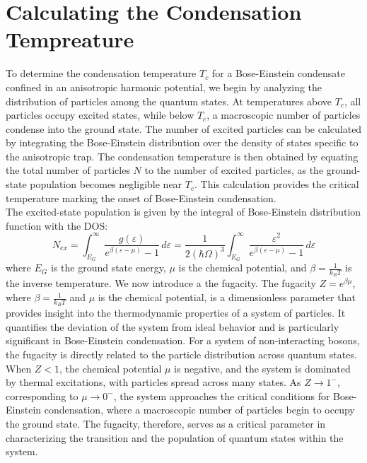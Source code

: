 \documentclass{article}
\numberwithin{equation}{section}
\numberwithin{equation}{subsection}
\begin{document}
\section{Calculating the Condensation Tempreature}
To determine the condensation temperature \( T_c \) for a Bose-Einstein condensate confined in an anisotropic harmonic potential, we begin by analyzing the distribution of particles among the quantum states. At temperatures above \( T_c \), all particles occupy excited states, while below \( T_c \), a macroscopic number of particles condense into the ground state. The number of excited particles can be calculated by integrating the Bose-Einstein distribution over the density of states specific to the anisotropic trap. The condensation temperature is then obtained by equating the total number of particles \( N \) to the number of excited particles, as the ground-state population becomes negligible near \( T_c \). This calculation provides the critical temperature marking the onset of Bose-Einstein condensation.\\

The excited-state population is given by the integral of Bose-Einstein distribution function with the DOS:
\begin{equation}
    N_{ex} = \int_{E_G}^{\infty}   \frac{g(\varepsilon)}{e^{\beta (\varepsilon - \mu)} - 1} \,d\varepsilon = \frac{1}{2(\hbar\Omega)^3}\int_{E_G}^{\infty}   \frac{\varepsilon^2}{e^{\beta (\varepsilon - \mu)} - 1} \,d\varepsilon
\end{equation}
where \( E_G \) is the ground state energy, \( \mu \) is the chemical potential, and \( \beta = \frac{1}{k_B T} \) is the inverse temperature.
We now introduce a the fugacity. The fugacity \( Z = e^{\beta \mu} \), where \( \beta = \frac{1}{k_B T} \) and \( \mu \) is the chemical potential, is a dimensionless parameter that provides insight into the thermodynamic properties of a system of particles. It quantifies the deviation of the system from ideal behavior and is particularly significant in Bose-Einstein condensation. For a system of non-interacting bosons, the fugacity is directly related to the particle distribution across quantum states.\\
When \( Z < 1 \), the chemical potential \( \mu \) is negative, and the system is dominated by thermal excitations, with particles spread across many states. As \( Z \to 1^- \), corresponding to \( \mu \to 0^- \), the system approaches the critical conditions for Bose-Einstein condensation, where a macroscopic number of particles begin to occupy the ground state. The fugacity, therefore, serves as a critical parameter in characterizing the transition and the population of quantum states within the system.\\
\end{document}
